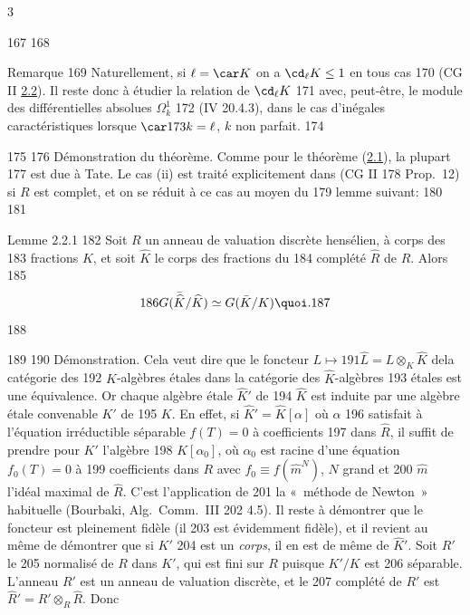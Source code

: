 3	\documentclass[10pt]{../fichiers-configuration-latex/smfart}
\begin{document}
   167	
   168	\begin{enonce*}[remark]{Remarque}
   169	Naturellement, si $\ell=\car K$ on a $\cd_{\ell}K\leq 1$ en tous cas
   170	(CG II \hyperref[X.thm2.2]{2.2}). Il reste donc à étudier la relation de $\cd_{\ell}K$
   171	avec, peut-être, le module des différentielles absolues $\Omega^1_k$
   172	(\EGA IV 20.4.3), dans le cas d'inégales caractéristiques lorsque $\car
   173	k=\ell$, $k$ non parfait. %
   174	\end{enonce*}
   175	
   176	Démonstration du théorème. Comme pour le théorème (\hyperref[X.thm2.1]{2.1}), la plupart
   177	est due à Tate. Le cas (ii) est traité explicitement dans (CG II
   178	Prop.~12) si $R$ est complet, et on se réduit à ce cas au moyen du
   179	lemme suivant:
   180	
   181	\begin{enonce*}{Lemme 2.2.1}
   182	Soit $R$ un anneau de valuation discrète hensélien, à corps des
   183	fractions $K$, et soit $\widehat{K}$ le corps des fractions du
   184	complété $\widehat{R}$ de $R$. Alors
   185	$$
   186	G(\bar{\widehat{K}}/\widehat{K})\simeq G(\bar{K}/K){\quoi}.
   187	$$
   188	\end{enonce*}
   189	
   190	Démonstration. Cela veut dire que le foncteur $L\mapsto
   191	\widehat{L}=L\otimes_K \widehat{K}$ de\pageoriginale la catégorie des
   192	$K$-algèbres étales dans la catégorie des $\widehat{K}$-algèbres
   193	étales est une équivalence. Or chaque algèbre étale $\widehat{K}'$ de
   194	$\widehat{K}$ est induite par une algèbre étale convenable $K'$ de
   195	$K$. En effet, si $\widehat{K}'=\widehat{K}[\alpha]$ où $\alpha$
   196	satisfait à l'équation irréductible séparable $f(T)=0$ à coefficients
   197	dans $\widehat{R}$, il suffit de prendre pour $K'$ l'algèbre 
   198	$K[\alpha_0]$, où $\alpha_0$ est racine d'une équation $f_0(T)=0$ à
   199	coefficients dans $R$ avec $f_0\equiv f(\widehat{m}^N)$, $N$ grand et
   200	$\widehat{m}$ l'idéal maximal de $\widehat{R}$. C'est l'application de
   201	la « méthode de Newton » habituelle (Bourbaki, Alg.~Comm.~III
   202	4.5). Il reste à démontrer que le foncteur est pleinement fidèle (il
   203	est évidemment fidèle), et il revient au même de démontrer que si $K'$
   204	est un \emph{corps}, il en est de même de $\widehat{K}'$. Soit $R'$ le
   205	normalisé de $R$ dans $K'$, qui est fini sur $R$ puisque $K'/K$ est
   206	séparable. L'anneau $R'$ est un anneau de valuation discrète, et le
   207	complété de $R'$ est $\widehat{R}'=R'\otimes_R \widehat{R}$. Donc
\end{document}
